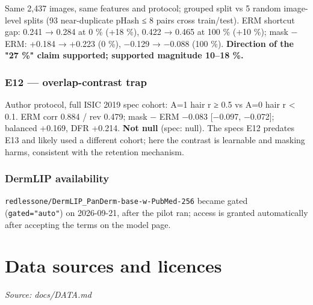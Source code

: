 {Same 2,437 images, same features and protocol; grouped split vs 5 random image-level splits (93 near-duplicate
pHash ≤ 8 pairs cross train/test). ERM shortcut gap: 0.241 → 0.284 at 0 \% (+18 \%), 0.422 → 0.465 at 100 \% (+10 \%);
mask − ERM: +0.184 → +0.223 (0 \%), −0.129 → −0.088 (100 \%). \textbf{Direction of the "27 \%" claim supported; supported
magnitude 10--18 \%.}

\subsubsection{E12 --- overlap-contrast trap}\label{e12--overlap-contrast-trap}

Author protocol, full ISIC 2019 spec cohort: A=1 hair r ≥ 0.5 vs A=0 hair r \textless{} 0.1. ERM corr 0.884 / rev 0.479;
mask − ERM −0.083 {[}−0.097, −0.072{]}; balanced +0.169, DFR +0.214. \textbf{Not null} (spec: null). The spec\textquotesingle s E12 predates
E13 and likely used a different cohort; here the contrast is learnable and masking harms, consistent with the
retention mechanism.

\subsubsection{DermLIP availability}\label{dermlip-availability}

\texttt{redlessone/DermLIP\_PanDerm-base-w-PubMed-256} became gated (\texttt{gated="auto"}) on 2026-09-21, after the pilot ran;
access is granted automatically after accepting the terms on the model page.

}

\section{Data sources and licences}\label{doc:DATA}
\noindent\textit{Source: docs/DATA.md}

